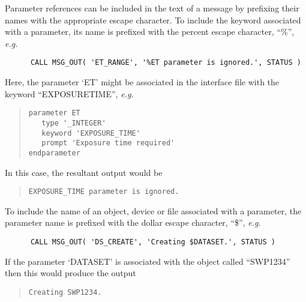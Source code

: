 \documentclass[twoside,11pt]{article}
\renewcommand{\_}{\texttt{\symbol{95}}}
\begin{document}
Parameter references can be included in the text of a message by prefixing
their names with the appropriate escape character.
To include the keyword associated with a parameter, its name is prefixed with
the percent escape character, ``\%'', \textit{e.g.}

\begin {small}
\begin{verbatim}
      CALL MSG_OUT( 'ET_RANGE', '%ET parameter is ignored.', STATUS )
\end{verbatim}
\end {small}

\begin {sloppypar}
Here, the parameter `ET' might be associated in the interface file
with the keyword ``EXPOSURE\_TIME'', \textit{e.g.}
\end {sloppypar}

\begin {quote}
\begin {small}
\begin{verbatim}
parameter ET
   type '_INTEGER'
   keyword 'EXPOSURE_TIME'
   prompt 'Exposure time required'
endparameter
\end{verbatim}
\end {small}
\end {quote}

In this case, the resultant output would be

\begin {quote}
\begin {small}
\begin{verbatim}
EXPOSURE_TIME parameter is ignored.
\end{verbatim}
\end {small}
\end {quote}

To include the name of an object, device or file associated with a parameter,
the parameter name is prefixed with the dollar escape character, ``\$'',
\textit{e.g.}

\begin {small}
\begin{verbatim}
      CALL MSG_OUT( 'DS_CREATE', 'Creating $DATASET.', STATUS )
\end{verbatim}
\end {small}

If the parameter `DATASET' is associated with the object called ``SWP1234''
then this would produce the output

\begin {quote}
\begin {small}
\begin{verbatim}
Creating SWP1234.
\end{verbatim}
\end {small}
\end {quote}
\end{document}
